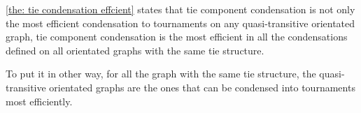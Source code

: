 \cref{the: tie condensation effcient} states that
tie component condensation
is not only the most efficient condensation to tournaments
on any quasi-transitive orientated graph,
tie component condensation
is the most efficient in all the condensations defined on
all orientated graphs with the same tie structure.

To put it in other way,
for all the graph with the same tie structure,
the quasi-transitive orientated graphs
are the ones that can be condensed into tournaments
most efficiently.
